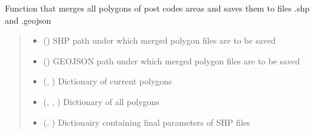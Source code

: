 \documentclass[letterpaper,10pt,english]{sphinxmanual}
\begin{document}

\begin{fulllineitems}
\label{\detokenize{pcm_utilities:pcm_utilities.merge_all_shps_save}}
\pysigstartsignatures
{}
\pysigstopsignatures
\sphinxAtStartPar
Function that merges all polygons of post codes areas and saves them to files .shp and .geojson
\begin{quote}\begin{description}
\begin{itemize}
\item {} 
\sphinxAtStartPar
{} () \textendash{} SHP path under which merged polygon files are to be saved

\item {} 
\sphinxAtStartPar
{} () \textendash{} GEOJSON path under which merged polygon files are to be saved

\item {} 
\sphinxAtStartPar
{} (\sphinxcode{\sphinxupquote{Dict}}{[}, \sphinxcode{\sphinxupquote{List}}{[}\sphinxcode{\sphinxupquote{Any}}{]}{]}) \textendash{} Dictionary of current polygons

\item {} 
\sphinxAtStartPar
{} (\sphinxcode{\sphinxupquote{Dict}}{[}, \sphinxcode{\sphinxupquote{Dict}}{[}, \sphinxcode{\sphinxupquote{Any}}{]}{]}) \textendash{} Dictionary of all polygons

\item {} 
\sphinxAtStartPar
{} (\sphinxcode{\sphinxupquote{Dict}}{[}, \sphinxcode{\sphinxupquote{Any}}{]}) \textendash{} Dictionairy containing final parameters of SHP files


\end{itemize}
\end{description}
\end{quote}
\end{fulllineitems}
\end{document}
